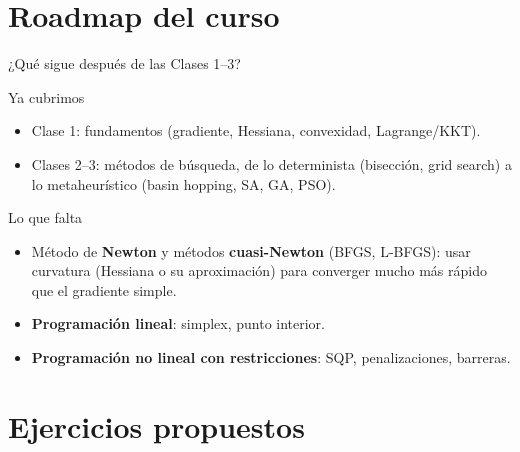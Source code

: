 \documentclass[aspectratio=169,10pt]{beamer}
\begin{document}
\section{Roadmap del curso}

\begin{frame}{¿Qué sigue después de las Clases 1--3?}
  \begin{block}{Ya cubrimos}
    \begin{itemize}
      \item Clase 1: fundamentos (gradiente, Hessiana, convexidad,
        Lagrange/KKT).
      \item Clases 2--3: métodos de búsqueda, de lo determinista
        (bisección, grid search) a lo metaheurístico (basin hopping,
        SA, GA, PSO).
    \end{itemize}
  \end{block}
  \begin{alertblock}{Lo que falta}
    \begin{itemize}
      \item Método de \textbf{Newton} y métodos \textbf{cuasi-Newton}
        (BFGS, L-BFGS): usar curvatura (Hessiana o su aproximación) para
        converger mucho más rápido que el gradiente simple.
      \item \textbf{Programación lineal}: simplex, punto interior.
      \item \textbf{Programación no lineal con restricciones}: SQP,
        penalizaciones, barreras.
    \end{itemize}
  \end{alertblock}
\end{frame}

\section{Ejercicios propuestos}
\end{document}

